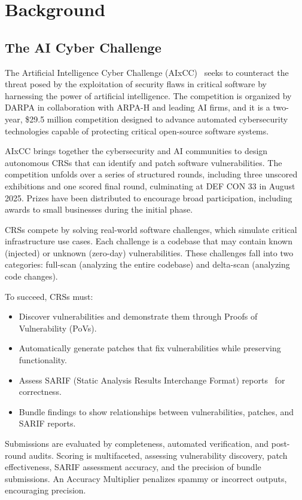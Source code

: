 \section{Background}
\label{background}

\subsection{The AI Cyber Challenge}
The Artificial Intelligence Cyber Challenge (AIxCC)~\cite{aixcc} seeks to counteract the threat posed by the exploitation of security flaws in critical software by harnessing the power of artificial intelligence. 
The competition is organized by DARPA in collaboration with ARPA-H and leading AI firms, and it is a two-year, \$29.5 million competition designed to advance automated cybersecurity technologies capable of protecting critical open-source software systems.

AIxCC brings together the cybersecurity and AI communities to design autonomous CRSs that can identify and patch software vulnerabilities. 
The competition unfolds over a series of structured rounds, including three unscored exhibitions and one scored final round, culminating at DEF CON 33 in August 2025. 
Prizes have been distributed to encourage broad participation, including awards to small businesses during the initial phase.

CRSs compete by solving real-world software challenges, which simulate critical infrastructure use cases. 
Each challenge is a codebase that may contain known (injected) or unknown (zero-day) vulnerabilities. 
These challenges fall into two categories: full-scan (analyzing the entire codebase) and delta-scan (analyzing code changes).

To succeed, CRSs must:
\begin{itemize}
    \item Discover vulnerabilities and demonstrate them through Proofs of Vulnerability (PoVs).
    \item Automatically generate patches that fix vulnerabilities while preserving functionality.
    \item Assess SARIF (Static Analysis Results Interchange Format) reports~\cite{sarif} for correctness.
    \item Bundle findings to show relationships between vulnerabilities, patches, and SARIF reports.
\end{itemize}

Submissions are evaluated by completeness, automated verification, and post-round audits. 
Scoring is multifaceted, assessing vulnerability discovery, patch effectiveness, SARIF assessment accuracy, and the precision of bundle submissions. 
An Accuracy Multiplier penalizes spammy or incorrect outputs, encouraging precision.

